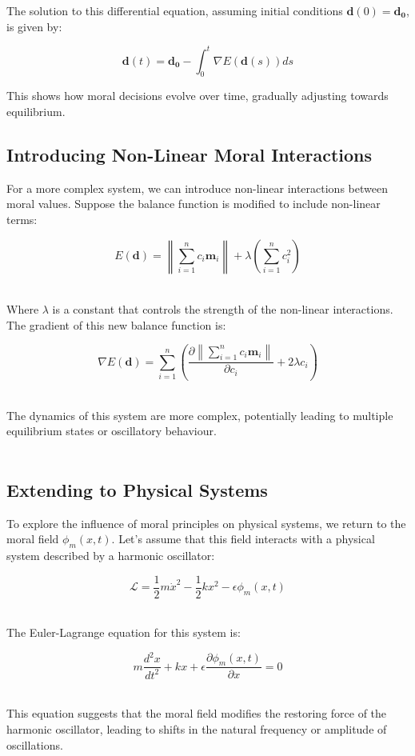 \documentclass{article}
\begin{document}
The solution to this differential equation, assuming initial conditions \( \mathbf{d}(0) = \mathbf{d_0} \), is given by:

\[
\mathbf{d}(t) = \mathbf{d_0} - \int_0^t \nabla E(\mathbf{d}(s)) ds
\]

This shows how moral decisions evolve over time, gradually adjusting towards equilibrium.

\subsection{Introducing Non-Linear Moral Interactions}

For a more complex system, we can introduce non-linear interactions between moral values. Suppose the balance function is modified to include non-linear terms:

\[
E(\mathbf{d}) = \left\lVert \sum_{i=1}^{n} c_i \mathbf{m}_i \right\rVert + \lambda \left( \sum_{i=1}^{n} c_i^2 \right)
\]
\

Where \( \lambda \) is a constant that controls the strength of the non-linear interactions. The gradient of this new balance function is:
\

\[
\nabla E(\mathbf{d}) = \sum_{i=1}^{n} \left( \frac{\partial \left\lVert \sum_{i=1}^{n} c_i \mathbf{m}_i \right\rVert}{\partial c_i} + 2 \lambda c_i \right)
\]
\

The dynamics of this system are more complex, potentially leading to multiple equilibrium states or oscillatory behaviour.
\\
\\

\subsection{Extending to Physical Systems}

To explore the influence of moral principles on physical systems, we return to the moral field \( \phi_m(x, t) \). Let's assume that this field interacts with a physical system described by a harmonic oscillator:

\[
\mathcal{L} = \frac{1}{2} m \dot{x}^2 - \frac{1}{2} k x^2 - \epsilon \phi_m(x, t)
\]
\

The Euler-Lagrange equation for this system is:

\[
m \frac{d^2 x}{dt^2} + kx + \epsilon \frac{\partial \phi_m(x, t)}{\partial x} = 0
\]
\

This equation suggests that the moral field modifies the restoring force of the harmonic oscillator, leading to shifts in the natural frequency or amplitude of oscillations.
\\
\\
\end{document}
